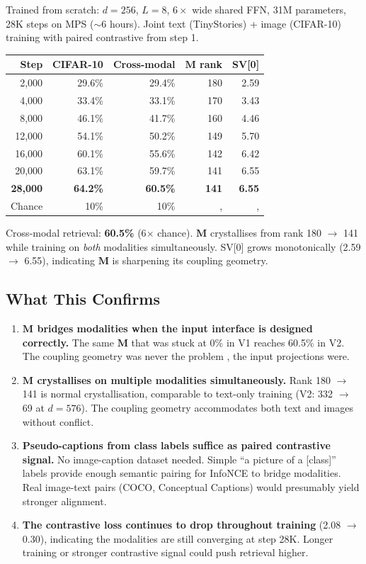 \documentclass[11pt, a4paper]{article}
\newcommand{\M}{\mathbf{M}}
\theoremstyle{plain}
\theoremstyle{remark}
\begin{document}
Trained from scratch: $d{=}256$, $L{=}8$, $6\times$ wide shared FFN, 31M parameters, 28K steps on MPS ($\sim$6 hours).
Joint text (TinyStories) + image (CIFAR-10) training with paired contrastive from step 1.

\begin{center}\small
\begin{tabular}{@{}rrrrr@{}}
\toprule
Step & CIFAR-10 & Cross-modal & $\M$ rank & SV[0] \\
\midrule
2,000 & 29.6\% & 29.4\% & 180 & 2.59 \\
4,000 & 33.4\% & 33.1\% & 170 & 3.43 \\
8,000 & 46.1\% & 41.7\% & 160 & 4.46 \\
12,000 & 54.1\% & 50.2\% & 149 & 5.70 \\
16,000 & 60.1\% & 55.6\% & 142 & 6.42 \\
20,000 & 63.1\% & 59.7\% & 141 & 6.55 \\
\textbf{28,000} & \textbf{64.2\%} & \textbf{60.5\%} & \textbf{141} & \textbf{6.55} \\
\midrule
Chance & 10\% & 10\% & ,  & ,  \\
\bottomrule
\end{tabular}
\end{center}

Cross-modal retrieval: \textbf{60.5\%} (6$\times$ chance).
$\M$ crystallises from rank 180 $\to$ 141 while training on \emph{both} modalities simultaneously.
SV[0] grows monotonically (2.59 $\to$ 6.55), indicating $\M$ is sharpening its coupling geometry.

\subsection{What This Confirms}

\begin{enumerate}[nosep]
    \item \textbf{$\M$ bridges modalities when the input interface is designed correctly.}
    The same $\M$ that was stuck at 0\% in V1 reaches 60.5\% in V2.
    The coupling geometry was never the problem ,  the input projections were.

    \item \textbf{$\M$ crystallises on multiple modalities simultaneously.}
    Rank 180 $\to$ 141 is normal crystallisation, comparable to text-only training (V2: 332 $\to$ 69 at $d{=}576$).
    The coupling geometry accommodates both text and images without conflict.

    \item \textbf{Pseudo-captions from class labels suffice as paired contrastive signal.}
    No image-caption dataset needed.
    Simple ``a picture of a [class]'' labels provide enough semantic pairing for InfoNCE to bridge modalities.
    Real image-text pairs (COCO, Conceptual Captions) would presumably yield stronger alignment.

    \item \textbf{The contrastive loss continues to drop throughout training} (2.08 $\to$ 0.30), indicating the modalities are still converging at step 28K.
    Longer training or stronger contrastive signal could push retrieval higher.
\end{enumerate}
\end{document}
